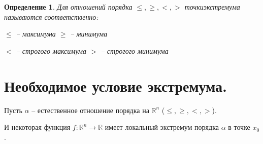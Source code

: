 \documentclass[20pt,a4paper]{extarticle}
\newtheorem*{definition}{Определение}
\newenvironment{ftdef}
  {\begin{mdframed}\begin{definition}}
  {\end{definition}\end{mdframed}}
\begin{document}
\begin{ftdef}
Для отношений порядка $\leq, \geq, <, >$ точки\linebreak экстремума называются соответственно:

$\leq$ -- максимума
$\geq$ -- минимума

$<$ -- строгого максимума
$>$ -- строгого минимума

\end{ftdef}
\section{Необходимое условие экстремума.}
\parindent=0cm
Пусть $\alpha$ -- естественное отношение порядка на $\mathbb{R}^n$ ($\leq, \geq, <, >$).

И некоторая функция $f: \mathbb{R}^n \to \mathbb{R}$ имеет локальный экстремум порядка $\alpha$ в точке $x_0$.
\end{document}
